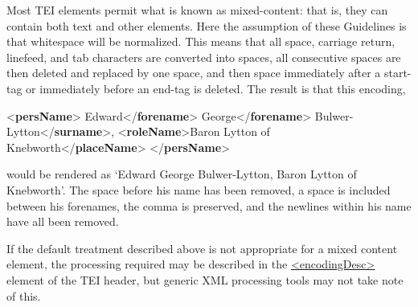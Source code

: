 Most TEI elements permit what is known as mixed-content: that is, they can contain both text and other elements. Here the assumption of these Guidelines is that whitespace will be normalized. This means that all space, carriage return, linefeed, and tab characters are converted into spaces, all consecutive spaces are then deleted and replaced by one space, and then space immediately after a start-tag or immediately before an end-tag is deleted. The result is that this encoding, \par\bgroup{}\exampleFont \begin{shaded}\noindent\mbox{}{<\textbf{persName}>}\mbox{}\newline 
{}Edward{</\textbf{forename}>}\mbox{}\newline 
{}George{</\textbf{forename}>}\mbox{}\newline 
{}Bulwer-Lytton{</\textbf{surname}>}, {<\textbf{roleName}>}Baron Lytton of\mbox{}\newline 
{}Knebworth{</\textbf{placeName}>}\mbox{}\newline 
{}\mbox{}\newline 
{</\textbf{persName}>}\end{shaded}\egroup\par \noindent  would be rendered as ‘Edward George Bulwer-Lytton, Baron Lytton of Knebworth’. The space before his name has been removed, a space is included between his forenames, the comma is preserved, and the newlines within his name have all been removed.\par
If the default treatment described above is not appropriate for a mixed content element, the processing required may be described in the \hyperref[TEI.encodingDesc]{<encodingDesc>} element of the TEI header, but generic XML processing tools may not take note of this.\par
